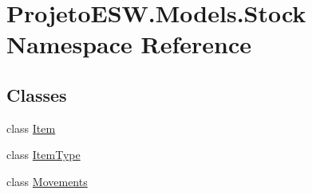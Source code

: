 \hypertarget{namespace_projeto_e_s_w_1_1_models_1_1_stock}{}\section{Projeto\+E\+S\+W.\+Models.\+Stock Namespace Reference}
\label{namespace_projeto_e_s_w_1_1_models_1_1_stock}
\subsection*{Classes}
\begin{DoxyCompactItemize}
\item 
class \mbox{\hyperlink{class_projeto_e_s_w_1_1_models_1_1_stock_1_1_item}{Item}}
\item 
class \mbox{\hyperlink{class_projeto_e_s_w_1_1_models_1_1_stock_1_1_item_type}{Item\+Type}}
\item 
class \mbox{\hyperlink{class_projeto_e_s_w_1_1_models_1_1_stock_1_1_movements}{Movements}}
\end{DoxyCompactItemize}
